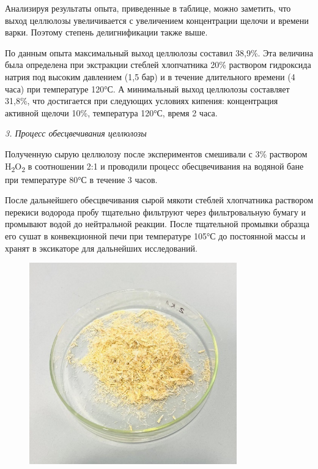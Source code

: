Анализируя результаты опыта, приведенные в таблице, можно заметить, что
выход целлюлозы увеличивается с увеличением концентрации щелочи и
времени варки. Поэтому степень делигнификации также выше.

По данным опыта максимальный выход целлюлозы составил 38,9\%. Эта
величина была определена при экстракции стеблей хлопчатника 20\%
раствором гидроксида натрия под высоким давлением (1,5 бар) и в течение
длительного времени (4 часа) при температуре 120°С. А минимальный выход
целлюлозы составляет 31,8\%, что достигается при следующих условиях
кипения: концентрация активной щелочи 10\%, температура 120°С, время 2
часа.

\emph{3. Процесс обесцвечивания целлюлозы}

Полученную сырую целлюлозу после экспериментов смешивали с 3\% раствором
H\textsubscript{2}O\textsubscript{2} в соотношении 2:1 и проводили
процесс обесцвечивания на водяной бане при температуре 80°С в течение 3
часов.

После дальнейшего обесцвечивания сырой мякоти стеблей хлопчатника
раствором перекиси водорода пробу тщательно фильтруют через
фильтровальную бумагу и промывают водой до нейтральной реакции. После
тщательной промывки образца его сушат в конвекционной печи при
температуре 105°С до постоянной массы и хранят в эксикаторе для
дальнейших исследований.

\begin{figure}[H]
	\centering
	\includegraphics[width=0.8\textwidth]{assets/80}
	\caption*{}
\end{figure}


